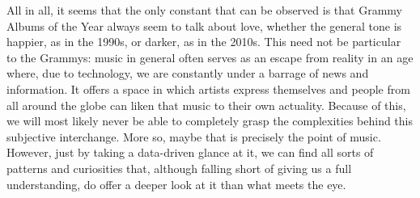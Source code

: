 \documentclass{article}
\begin{document}
\FloatBarrier

All in all, it seems that the only constant that can be observed is that Grammy Albums of the Year always seem to talk about love, whether the general tone is happier, as in the 1990s, or darker, as in the 2010s. This need not be particular to the Grammys: music in general often serves as an escape from reality in an age where, due to technology, we are constantly under a barrage of news and information. It offers a space in which artists express themselves and people from all around the globe can liken that music to their own actuality. Because of this, we will most likely never be able to completely grasp the complexities behind this subjective interchange. More so, maybe that is precisely the point of music. However, just by taking a data-driven glance at it, we can find all sorts of patterns and curiosities that, although falling short of giving us a full understanding, do offer a deeper look at it than what meets the eye.




\FloatBarrier
\nocite{*}








\end{document}

